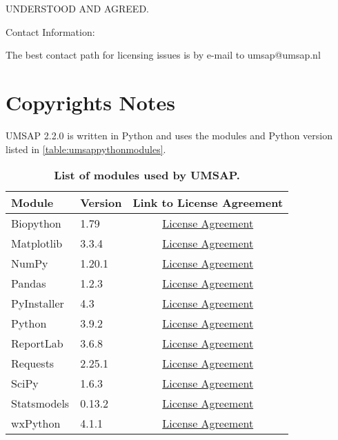 UNDERSTOOD AND AGREED.

Contact Information:

The best contact path for licensing issues is by e-mail to umsap@umsap.nl

\section{Copyrights Notes}

UMSAP \num[parse-numbers=false]{2.2.0} is written in Python and uses the modules
and Python version listed in \autoref{table:umsappythonmodules}.
\begin{table}[h!]
    \centering
    \begin{tabular}{llc}
        \hline
        Module & Version & Link to License Agreement\\
        \hline
        Biopython   & \num{1.79}                        & \href{https://github.com/biopython/biopython/blob/master/LICENSE.rst}{License Agreement}\\
        Matplotlib  & \num[parse-numbers=false]{3.3.4}  & \href{https://matplotlib.org/3.3.4/users/license.html}{License Agreement}\\
        NumPy       & \num[parse-numbers=false]{1.20.1} & \href{https://numpy.org/doc/stable/license.html}{License Agreement}\\
        Pandas      & \num[parse-numbers=false]{1.2.3}  & \href{https://pandas.pydata.org/docs/getting_started/overview.html#license}{License Agreement}\\
        PyInstaller & \num{4.3}                         & \href{https://pyinstaller.org/en/stable/license.html}{License Agreement}\\
        Python      & \num[parse-numbers=false]{3.9.2}  & \href{https://docs.python.org/3.9/license.html}{License Agreement}\\
        ReportLab   & \num[parse-numbers=false]{3.6.8}  & \href{https://www.reportlab.com/dev/docs/faq/#1.3}{License Agreement}\\
        Requests    & \num[parse-numbers=false]{2.25.1} & \href{https://github.com/psf/requests/blob/main/LICENSE}{License Agreement}\\
        SciPy       & \num[parse-numbers=false]{1.6.3}  & \href{https://github.com/scipy/scipy/blob/main/LICENSE.txt}{License Agreement}\\
        Statsmodels & \num[parse-numbers=false]{0.13.2} & \href{https://www.statsmodels.org/stable/dev/index.html#license}{License Agreement}\\
        wxPython    & \num[parse-numbers=false]{4.1.1}  & \href{https://wxpython.org/pages/license/index.html}{License Agreement}\\
        \hline
    \end{tabular}
    \caption[List of modules used by UMSAP]{\textbf{List of modules used by UMSAP.}}
    \label{table:umsappythonmodules}
\end{table}
\newpage